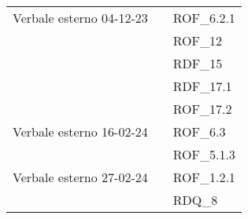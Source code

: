 \begin{xltabular}{\textwidth}{ p{0.3\textwidth} | X | p{0.2\textwidth} }
    Verbale esterno 04-12-23 & & ROF\_6.2.1\\
    &&ROF\_12\\
    &&RDF\_15\\
    &&RDF\_17.1\\
    &&ROF\_17.2\\


     Verbale esterno 16-02-24 & & ROF\_6.3\\
    &&ROF\_5.1.3\\

     Verbale esterno 27-02-24 & & ROF\_1.2.1\\
     & & RDQ\_8\\
    

\end{xltabular}
